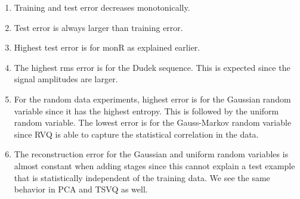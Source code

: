 \begin{enumerate}
\item Training and test error decreases monotonically.
\item Test error is always larger than training error.
\item Highest test error is for monR as explained earlier.
\item The highest rms error is for the Dudek sequence.  This is expected since the signal amplitudes are larger.
\item For the random data experiments, highest error is for the Gaussian random variable since it has the highest entropy.  This is followed by the uniform random variable.  The lowest error is for the Gauss-Markov random variable since RVQ is able to capture the statistical correlation in the data.
\item The reconstruction error for the Gaussian and uniform random variables is almost constant when adding stages since this cannot explain a test example that is statistically independent of the training data.  We see the same behavior in PCA and TSVQ as well.

\end{enumerate}
